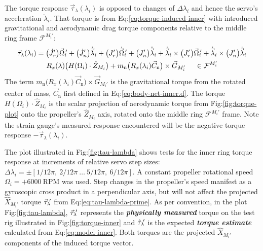 \par
The torque response $\vec{\tau}_\lambda(\lambda_i)$ is opposed to changes of $\Delta\lambda_i$ and hence the servo's acceleration $\ddot{\lambda}_i$. That torque is from Eq:\ref{eq:torque-induced-inner} with introduced gravitational and aerodynamic drag torque components relative to the middle ring frame $\mathcal{F}^{M_i'}$:
\begin{multline}\label{eq:model-inner}
\vec{\tau}_\lambda(\lambda_i)=\big(\dot{J}_{r}'\big)\vec{\Omega}_i\text{}\hspace{-2pt}'+\big(\dot{J}_{n}'\big)\dot{\vec{\lambda}}_i+\big(J_r'\big)\dot{\vec{\Omega}}_i\text{}\hspace{-2pt}'+\big(J_{n}'\big)\ddot{\vec{\lambda}}_i+\dot{\vec{\lambda}}_i\times \big(J_r'\big)\vec{\Omega}_i\text{}\hspace{-2pt}'+\dot{\vec{\lambda}}_i\times \big(J_{n}'\big)\dot{\vec{\lambda}}_i
\\
R_x(\lambda)\big(H(\Omega_i)\cdot\hat{Z}_{M_i}\big)+m_\text{n}\big(R_x(\lambda_i)\vec{C}_{\text{n}}\big)\times\vec{G}_{M_i'}~~~~\in\mathcal{F}^{M_i'}
\end{multline}
The term $m_\text{n}\big(R_x(\lambda_i)\vec{C}_{\text{n}}\big)\times\vec{G}_{M_i'}$ is the gravitational torque from the rotated center of mass, $\vec{C}_{\text{n}}$ first defined in Eq:\ref{eq:body-net-inner.d}. The torque $H(\Omega_i)\cdot\hat{Z}_{M_i}$ is the scalar projection of aerodynamic torque from Fig:\ref{fig:torque-plot} onto the propeller's $\hat{Z}_{M_i}$ axis, rotated onto the middle ring $\mathcal{F}^{M_i'}$ frame. Note the strain gauge's measured response encountered will be the negative torque response $-\vec{\tau}_\lambda(\lambda_i)$.
\par
The plot illustrated in Fig:\ref{fig:tau-lambda} shows tests for the inner ring torque response at increments of relative servo step sizes: $\Delta\lambda_i=\pm[1/12\pi,~2/12\pi~\ldots~5/12\pi,~6/12\pi]$. A constant propeller rotational speed $\Omega_i=+6000~\text{RPM}$ was used. Step changes in the propeller's speed manifest as a gyroscopic cross product in a perpendicular axis, but will not affect the projected $\hat{X}_{M_i'}$ torque $\vec{\tau}_\lambda\text{}\hspace{-2pt}'$ from Eq:\ref{eq:tau-lambda-prime}. As per convention, in the plot Fig:\ref{fig:tau-lambda}, $\vec{\tau}_\lambda\text{}\hspace{-2pt}'$ represents the \emph{\textbf{physically measured}} torque on the test rig illustrated in Fig:\ref{fig:torque-inner} and $\hat{\tau}_\lambda\text{}\hspace{-2pt}'$ is the expected \emph{\textbf{torque estimate}} calculated from Eq:\ref{eq:model-inner}. Both torques are the projected $\hat{X}_{M_i'}$ components of the induced torque vector. 
